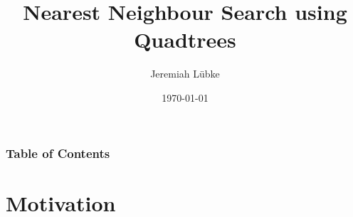 \documentclass[mathserif]{beamer}
\title{Nearest Neighbour Search using Quadtrees}
\author{Jeremiah Lübke}
\date{\today}
\begin{document}
\frame{\titlepage}

\begin{frame}
    \frametitle{Table of Contents}
    \tableofcontents
\end{frame}

\section{Motivation}
% 





\setcounter{equation}{0}





\end{document}
